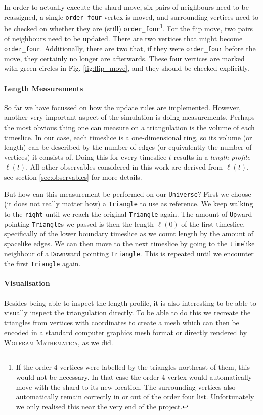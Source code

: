 In order to actually execute the shard move, six pairs of neighbours need to be reassigned, a single \verb|order_four| vertex is moved, and surrounding vertices need to be checked on whether they are (still) \verb|order_four|\footnote{If the order 4 vertices were labelled by the triangles northeast of them, this would not be necessary. In that case the order 4 vertex would automatically move with the shard to its new location. The surrounding vertices also automatically remain correctly in or out of the order four list. Unfortunately we only realised this near the very end of the project.}. For the flip move, two pairs of neighbours need to be updated. There are two vertices that might become \verb|order_four|. Additionally, there are two that, if they were \verb|order_four| before the move, they certainly no longer are afterwards. These four vertices are marked with green circles in Fig. \ref{fig:flip_move}, and they should be checked explicitly.

\paragraph{Length Measurements}
So far we have focussed on how the update rules are implemented. However, another very important aspect of the simulation is doing measurements. Perhaps the most obvious thing one can measure on a triangulation is the volume of each timeslice. In our case, each timeslice is a one-dimensional ring, so its volume (or length) can be described by the number of edges (or equivalently the number of vertices) it consists of. Doing this for every timeslice $t$ results in a \emph{length profile} $\ell(t)$. All other observables considered in this work are derived from $\ell(t)$, see section \ref{sec:observables} for more details.

But how can this measurement be performed on our \verb|Universe|? First we choose (it does not really matter how) a \verb|Triangle| to use as reference. We keep walking to the \verb|right| until we reach the original \verb|Triangle| again. The amount of \verb|Up|ward pointing \verb|Triangle|s we passed is then the length $\ell(0)$ of the first timeslice, specifically of the lower boundary timeslice as we count length by the amount of spacelike edges. We can then move to the next timeslice by going to the \verb|time|like neighbour of a \verb|Down|ward pointing \verb|Triangle|. This is repeated until we encounter the first \verb|Triangle| again.

\paragraph{Visualisation}
Besides being able to inspect the length profile, it is also interesting to be able to visually inspect the triangulation directly.
To be able to do this we recreate the triangles from vertices with coordinates to create a mesh which can then be encoded in a standard computer graphics mesh format or directly rendered by \textsc{Wolfram Mathematica}, as we did.

